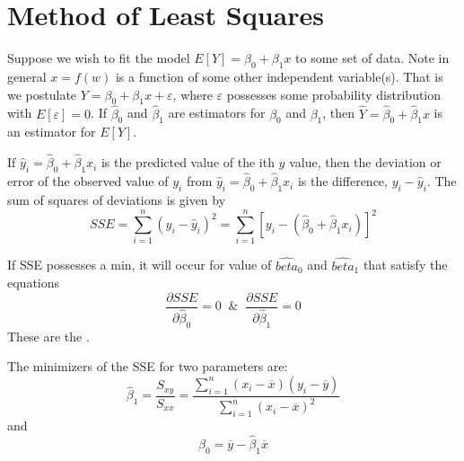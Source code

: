 \documentclass[12pt, a4paper, twoside, openright, titlepage]{book}
\begin{document}
\section{\textsection Method of Least Squares}

Suppose we wish to fit the model $E[Y] = \beta_0 + \beta_1x$ to some set of data. Note in general $x = f(w)$ is a function of some other independent variable(s). That is we postulate $Y = \beta_0+\beta_1x +\varepsilon$, where $\varepsilon$ possesses some probability distribution with $E[\varepsilon] = 0$. If $\hat{\beta}_0$ and $\hat{\beta}_1$ are estimators for $\beta_0$ and $\beta_1$, then $\hat{Y} = \hat{\beta}_0+\hat{\beta}_1x$ is an estimator for $E[Y]$.

\begin{defn}{}{}
    If $\hat{y}_i = \hat{\beta}_0+\hat{\beta}_1x_i$ is the predicted value of the ith $y$ value, then the deviation or error of the observed value of $y_i$ from $\hat{y}_i = \hat{\beta}_0 + \hat{\beta}_1x_i$ is the difference, $y_i - \hat{y}_i$. The sum of squares of deviations is given by \begin{equation*}
        SSE = \sum_{i=1}^n(y_i - \hat{y}_i)^2 = \sum_{i=1}^n[y_i - (\hat{\beta}_0 + \hat{\beta}_1x_i)]^2
    \end{equation*}
\end{defn}


If SSE possesses a min, it will occur for value of $\hat{beta}_0$ and $\hat{beta}_1$ that satisfy the equations \begin{equation*}
    \frac{\partial SSE}{\partial\hat{\beta}_0} = 0\;\;\&\;\;\frac{\partial SSE}{\partial\hat{\beta}_1} = 0
\end{equation*}
These are the .


\begin{claim}{}{}
    The minimizers of the SSE for two parameters are: \begin{equation*}
        \hat{\beta}_1 = \frac{S_{xy}}{S_{xx}} = \frac{\sum_{i=1}^n(x_i-\overline{x})(y_i - \overline{y})}{\sum_{i=1}^n(x_i-\overline{x})^2}
    \end{equation*}
    and \begin{equation*}
        \hat{\beta}_0 = \overline{y} - \hat{\beta}_1\overline{x}
    \end{equation*}
\end{claim}
\end{document}
